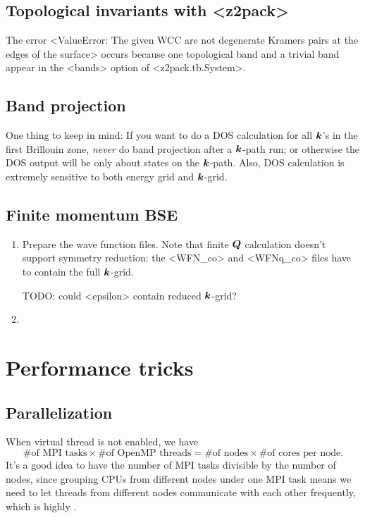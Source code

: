 \documentclass[hyperref, a4paper, 12pt]{report}
\def\texttt#1{<#1>}%
\newcommand{\shortcode}[1]{\texttt{#1}}
\begin{document}
\subsection{Topological invariants with \shortcode{z2pack}}

The error \shortcode{ValueError: The given WCC are not degenerate Kramers pairs at the edges of the surface}
occurs because one topological band and a trivial band appear in the \shortcode{bands} option 
of \shortcode{z2pack.tb.System}.

\subsection{Band projection}

One thing to keep in mind: 
If you want to do a DOS calculation for all $\vb*{k}$'s in the first Brillouin zone,
\emph{never} do band projection after a $\vb*{k}$-path run;
or otherwise the DOS output will be only about states on the $\vb*{k}$-path.
Also, DOS calculation is extremely sensitive to both energy grid and $\vb*{k}$-grid.

\subsection{Finite momentum BSE}

\begin{enumerate}
    \item Prepare the wave function files.
        Note that finite $\vb*{Q}$ calculation doesn't support symmetry reduction: 
        the \shortcode{WFN_co} and \shortcode{WFNq_co} files 
        have to contain the full $\vb*{k}$-grid.

        TODO: could \shortcode{epsilon} contain reduced $\vb*{k}$-grid?
    \item 
\end{enumerate}

\section{Performance tricks}

\subsection{Parallelization}

When virtual thread is not enabled, we have 
\begin{equation}
    \text{\# of MPI tasks} \times 
    \text{\# of OpenMP threads}
    = \text{\# of nodes} \times 
    \text{\# of cores per node}.
\end{equation}
It's a good idea to have the number of MPI tasks 
divisible by the number of nodes, 
since grouping CPUs from different nodes under one MPI task 
means we need to let threads from different nodes communicate with each other frequently,
which is highly .
\end{document}
